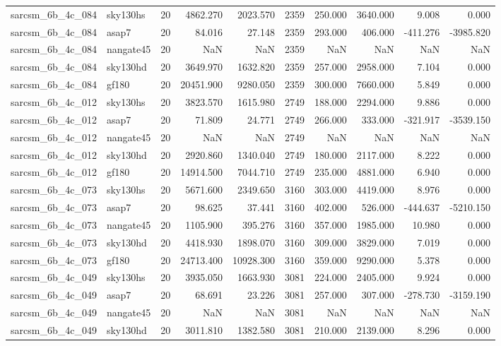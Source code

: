 \begin{longtable}{llrrrrrrrr}
sarcsm\_6b\_4c\_084 & sky130hs & 20 & 4862.270 & 2023.570 & 2359 & 250.000 & 3640.000 & 9.008 & 0.000 \\
sarcsm\_6b\_4c\_084 & asap7 & 20 & 84.016 & 27.148 & 2359 & 293.000 & 406.000 & -411.276 & -3985.820 \\
sarcsm\_6b\_4c\_084 & nangate45 & 20 & NaN & NaN & 2359 & NaN & NaN & NaN & NaN \\
sarcsm\_6b\_4c\_084 & sky130hd & 20 & 3649.970 & 1632.820 & 2359 & 257.000 & 2958.000 & 7.104 & 0.000 \\
sarcsm\_6b\_4c\_084 & gf180 & 20 & 20451.900 & 9280.050 & 2359 & 300.000 & 7660.000 & 5.849 & 0.000 \\
sarcsm\_6b\_4c\_012 & sky130hs & 20 & 3823.570 & 1615.980 & 2749 & 188.000 & 2294.000 & 9.886 & 0.000 \\
sarcsm\_6b\_4c\_012 & asap7 & 20 & 71.809 & 24.771 & 2749 & 266.000 & 333.000 & -321.917 & -3539.150 \\
sarcsm\_6b\_4c\_012 & nangate45 & 20 & NaN & NaN & 2749 & NaN & NaN & NaN & NaN \\
sarcsm\_6b\_4c\_012 & sky130hd & 20 & 2920.860 & 1340.040 & 2749 & 180.000 & 2117.000 & 8.222 & 0.000 \\
sarcsm\_6b\_4c\_012 & gf180 & 20 & 14914.500 & 7044.710 & 2749 & 235.000 & 4881.000 & 6.940 & 0.000 \\
sarcsm\_6b\_4c\_073 & sky130hs & 20 & 5671.600 & 2349.650 & 3160 & 303.000 & 4419.000 & 8.976 & 0.000 \\
sarcsm\_6b\_4c\_073 & asap7 & 20 & 98.625 & 37.441 & 3160 & 402.000 & 526.000 & -444.637 & -5210.150 \\
sarcsm\_6b\_4c\_073 & nangate45 & 20 & 1105.900 & 395.276 & 3160 & 357.000 & 1985.000 & 10.980 & 0.000 \\
sarcsm\_6b\_4c\_073 & sky130hd & 20 & 4418.930 & 1898.070 & 3160 & 309.000 & 3829.000 & 7.019 & 0.000 \\
sarcsm\_6b\_4c\_073 & gf180 & 20 & 24713.400 & 10928.300 & 3160 & 359.000 & 9290.000 & 5.378 & 0.000 \\
sarcsm\_6b\_4c\_049 & sky130hs & 20 & 3935.050 & 1663.930 & 3081 & 224.000 & 2405.000 & 9.924 & 0.000 \\
sarcsm\_6b\_4c\_049 & asap7 & 20 & 68.691 & 23.226 & 3081 & 257.000 & 307.000 & -278.730 & -3159.190 \\
sarcsm\_6b\_4c\_049 & nangate45 & 20 & NaN & NaN & 3081 & NaN & NaN & NaN & NaN \\
sarcsm\_6b\_4c\_049 & sky130hd & 20 & 3011.810 & 1382.580 & 3081 & 210.000 & 2139.000 & 8.296 & 0.000 \\

\end{longtable}
